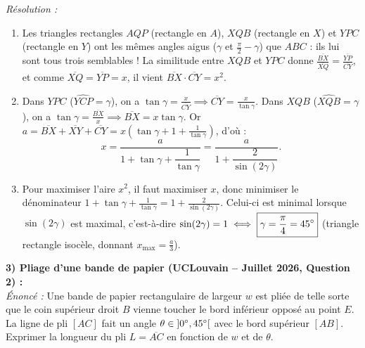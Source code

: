 \begin{exemple}
\emph{Résolution :}
\begin{enumerate}[label=(\alph*)]
    \item Les triangles rectangles $AQP$ (rectangle en $A$), $XQB$ (rectangle en $X$) et $YPC$ (rectangle en $Y$) ont les mêmes angles aigus ($\gamma$ et $\frac{\pi}{2}-\gamma$) que $ABC$ : ils lui sont tous trois semblables ! La similitude entre $XQB$ et $YPC$ donne $\frac{\overline{BX}}{\overline{XQ}} = \frac{\overline{YP}}{\overline{CY}}$, et comme $\overline{XQ} = \overline{YP} = x$, il vient $\overline{BX}\cdot\overline{CY} = x^2$.
    \item Dans $YPC$ ($\widehat{YCP}=\gamma$), on a $\tan\gamma = \frac{x}{\overline{CY}} \implies \overline{CY} = \frac{x}{\tan\gamma}$. Dans $XQB$ ($\widehat{XQB}=\gamma$), on a $\tan\gamma = \frac{\overline{BX}}{x} \implies \overline{BX} = x\tan\gamma$. Or $a = \overline{BX} + \overline{XY} + \overline{CY} = x\left(\tan\gamma + 1 + \frac{1}{\tan\gamma}\right)$, d'où :
    \[
        \boxed{x = \frac{a}{1 + \tan\gamma + \dfrac{1}{\tan\gamma}} = \frac{a}{1 + \dfrac{2}{\sin(2\gamma)}}}.
    \]
    \item Pour maximiser l'aire $x^2$, il faut maximiser $x$, donc minimiser le dénominateur $1 + \tan\gamma + \frac{1}{\tan\gamma} = 1 + \frac{2}{\sin(2\gamma)}$. Celui-ci est minimal lorsque $\sin(2\gamma)$ est maximal, c'est-à-dire $\sin(2\gamma) = 1 \iff \boxed{\gamma = \frac{\pi}{4} = 45\degree}$ (triangle rectangle isocèle, donnant $x_{\max} = \frac{a}{3}$).
\end{enumerate}

\medskip
\textbf{3) Pliage d'une bande de papier (UCLouvain -- Juillet 2026, Question 2) :}\\
\emph{Énoncé :} Une bande de papier rectangulaire de largeur $w$ est pliée de telle sorte que le coin supérieur droit $B$ vienne toucher le bord inférieur opposé au point $E$. La ligne de pli $[AC]$ fait un angle $\theta \in \left]0\degree, 45\degree\right[$ avec le bord supérieur $[AB]$. Exprimer la longueur du pli $L = \overline{AC}$ en fonction de $w$ et de $\theta$.

\begin{center}
\end{center}
\end{exemple}
